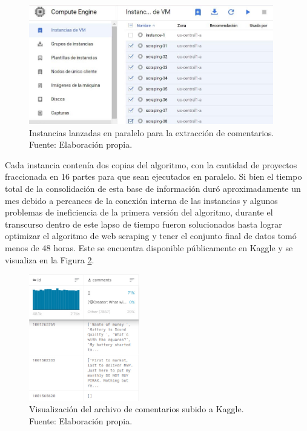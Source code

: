 \begin{figure}[!ht]
	\begin{center}
		\includegraphics[width=0.95\textwidth]{4/figures/gc_instances_comments.jpg}
		\caption[Instancias lanzadas en paralelo para la extracción de comentarios]{Instancias lanzadas en paralelo para la extracción de comentarios.\\
			Fuente: Elaboración propia.}
		\label{4:fig10}
	\end{center}
\end{figure}

Cada instancia contenía dos copias del algoritmo, con la cantidad de proyectos fraccionada en 16 partes para que sean ejecutados en paralelo. Si bien el tiempo total de la consolidación de esta base de información duró aproximadamente un mes debido a percances de la conexión interna de las instancias y algunos problemas de ineficiencia de la primera versión del algoritmo, durante el transcurso dentro de este lapso de tiempo fueron solucionados hasta lograr optimizar el algoritmo de web scraping y tener el conjunto final de datos tomó menos de 48 horas. Este se encuentra disponible públicamente en Kaggle y se visualiza en la Figura \ref{4:fig11}.

\begin{figure}[!ht]
	\begin{center}
		\includegraphics[width=0.43\textwidth]{4/figures/comments_kaggle_preview.jpg}
		\caption[Visualización del archivo de comentarios subido a Kaggle]{Visualización del archivo de comentarios subido a Kaggle.\\
			Fuente: Elaboración propia.}
		\label{4:fig11}
	\end{center}
\end{figure}

